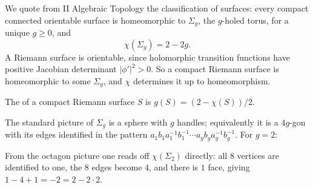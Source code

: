 We quote from II Algebraic Topology the classification of surfaces: every compact
connected orientable surface is homeomorphic to $\Sigma_g$, the $g$-holed torus, for a
unique $g \geq 0$, and
$$
\chi(\Sigma_g) = 2 - 2g.
$$
A Riemann surface is orientable, since holomorphic transition functions have positive
Jacobian determinant $|\phi'|^2 > 0$. So a compact Riemann surface is homeomorphic to some
$\Sigma_g$, and $\chi$ determines it up to homeomorphism.

\begin{definition}[Genus]
	The  of a compact Riemann surface $S$ is $g(S) = (2 - \chi(S))/2$.
\end{definition}

The standard picture of $\Sigma_g$ is a sphere with $g$ handles; equivalently it is a
$4g$-gon with its edges identified in the pattern
$a_1b_1a_1^{-1}b_1^{-1}\cdots a_gb_ga_g^{-1}b_g^{-1}$. For $g = 2$:

\begin{center}
\end{center}

From the octagon picture one reads off $\chi(\Sigma_2)$ directly: all $8$ vertices are
identified to one, the $8$ edges become $4$, and there is $1$ face, giving
$1 - 4 + 1 = -2 = 2 - 2\cdot 2$.

